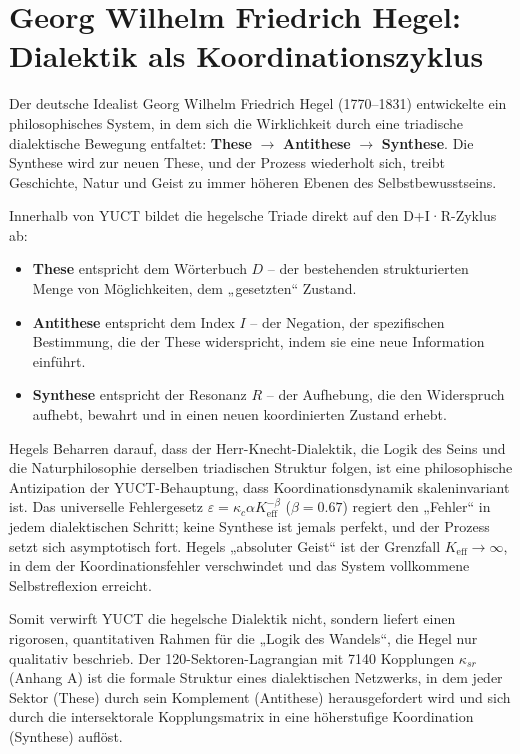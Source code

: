 \documentclass[12pt,a4paper]{article}
\begin{document}
	\section{Georg Wilhelm Friedrich Hegel: Dialektik als Koordinationszyklus}
	
	Der deutsche Idealist Georg Wilhelm Friedrich Hegel (1770–1831) entwickelte ein philosophisches System, in dem sich die Wirklichkeit durch eine triadische dialektische Bewegung entfaltet: \textbf{These} \(\to\) \textbf{Antithese} \(\to\) \textbf{Synthese}. Die Synthese wird zur neuen These, und der Prozess wiederholt sich, treibt Geschichte, Natur und Geist zu immer höheren Ebenen des Selbstbewusstseins.
	
	Innerhalb von YUCT bildet die hegelsche Triade direkt auf den D+I·R-Zyklus ab:
	\begin{itemize}
		\item \textbf{These} entspricht dem Wörterbuch \(D\) – der bestehenden strukturierten Menge von Möglichkeiten, dem „gesetzten“ Zustand.
		\item \textbf{Antithese} entspricht dem Index \(I\) – der Negation, der spezifischen Bestimmung, die der These widerspricht, indem sie eine neue Information einführt.
		\item \textbf{Synthese} entspricht der Resonanz \(R\) – der Aufhebung, die den Widerspruch aufhebt, bewahrt und in einen neuen koordinierten Zustand erhebt.
	\end{itemize}
	
	Hegels Beharren darauf, dass der Herr-Knecht-Dialektik, die Logik des Seins und die Naturphilosophie derselben triadischen Struktur folgen, ist eine philosophische Antizipation der YUCT-Behauptung, dass Koordinationsdynamik skaleninvariant ist. Das universelle Fehlergesetz \(\varepsilon = \kappa_c \alpha K_{\mathrm{eff}}^{-\beta}\) (\(\beta=0.67\)) regiert den „Fehler“ in jedem dialektischen Schritt; keine Synthese ist jemals perfekt, und der Prozess setzt sich asymptotisch fort. Hegels „absoluter Geist“ ist der Grenzfall \(K_{\mathrm{eff}} \to \infty\), in dem der Koordinationsfehler verschwindet und das System vollkommene Selbstreflexion erreicht.
	
	Somit verwirft YUCT die hegelsche Dialektik nicht, sondern liefert einen rigorosen, quantitativen Rahmen für die „Logik des Wandels“, die Hegel nur qualitativ beschrieb. Der 120-Sektoren-Lagrangian mit 7140 Kopplungen \(\kappa_{sr}\) (Anhang A) ist die formale Struktur eines dialektischen Netzwerks, in dem jeder Sektor (These) durch sein Komplement (Antithese) herausgefordert wird und sich durch die intersektorale Kopplungsmatrix in eine höherstufige Koordination (Synthese) auflöst.
	
\end{document}
